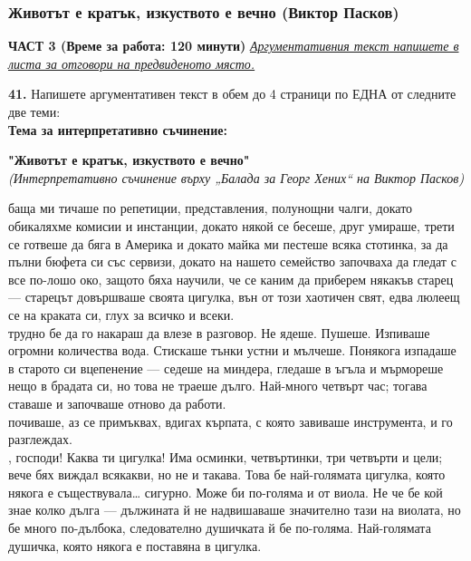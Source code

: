 \documentclass[12pt,a4paper]{article}
\begin{document}
\subsubsection{Животът е кратък, изкуството е вечно (Виктор Пасков)}
\vspace{0.5cm}
\begin{center}
\textbf{ЧАСТ 3 (Време за работа: 120 минути)}
\vspace{0.2cm}
{\textit{\underline{Аргументативния текст напишете в листа за отговори на предвиденото място.}}}
\vspace{0.1cm}
\end{center}
\textbf{41.} Напишете аргументативен текст в обем до 4 страници по ЕДНА от следните две теми:
\\
\vspace{0.2cm}
\textbf{Тема за интерпретативно съчинение:}
\vspace{0.1cm}
\begin{center}
\textbf{"Животът е кратък, изкуството е вечно"}
\\
\textit{(Интерпретативно съчинение върху „Балада за Георг Хених“ на Виктор Пасков)}
\end{center}
 баща ми тичаше по репетиции, представления, полунощни чалги, докато обикаляхме комисии и инстанции, докато някой се бесеше, друг умираше, трети се готвеше да бяга в Америка и докато майка ми пестеше всяка стотинка, за да пълни бюфета си със сервизи, докато на нашето семейство започваха да гледат с все по-лошо око, защото бяха научили, че се каним да приберем някакъв старец — старецът довършваше своята цигулка, вън от този хаотичен свят, едва люлеещ се на краката си, глух за всичко и всеки.
\\
 трудно бе да го накараш да влезе в разговор. Не ядеше. Пушеше. Изпиваше огромни количества вода. Стискаше тънки устни и мълчеше. Понякога изпадаше в старото си вцепенение — седеше на миндера, гледаше в ъгъла и мърмореше нещо в брадата си, но това не траеше дълго. Най-много четвърт час; тогава ставаше и започваше отново да работи.
\\
 почиваше, аз се примъквах, вдигах кърпата, с която завиваше инструмента, и го разглеждах.
\\
, господи! Каква ти цигулка! Има осминки, четвъртинки, три четвърти и цели; вече бях виждал всякакви, но не и такава. Това бе най-голямата цигулка, която някога е съществувала… сигурно. Може би по-голяма и от виола. Не че бе кой знае колко дълга — дължината й не надвишаваше значително тази на виолата, но бе много по-дълбока, следователно душичката й бе по-голяма. Най-голямата душичка, която някога е поставяна в цигулка.
\end{document}
